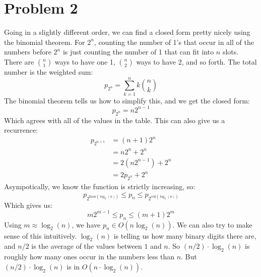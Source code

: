 \documentclass{article}
\begin{document}
    \section*{Problem 2}
        Going in a slightly different order, we can find a closed form pretty nicely using the
        binomial theorem. For $2^{n}$, counting the number of 1's that occur in all of the numbers
        before $2^{n}$ is just counting the number of 1 that can fit into $n$ slots.
        There are $\binom{n}{1}$ ways to have one 1, $\binom{n}{2}$ ways to have 2, and so forth.
        The total number is the weighted sum:
        \begin{equation}
            p_{2^{n}}=\sum_{k=1}^{n}k\binom{n}{k}
        \end{equation}
        The binomial theorem tells us how to simplify this, and we get the closed form:
        \begin{equation}
            p_{2^{n}}=n2^{n-1}
        \end{equation}
        Which agrees with all of the values in the table. This can also give us a
        recurrence:
        \begin{subequations}
            \begin{align}
                p_{2^{n+1}}&=(n+1)2^{n}\\
                    &=n2^{n}+2^{n}\\
                    &=2(n2^{n-1})+2^{n}\\
                    &=2p_{2^{n}}+2^{n}
            \end{align}
        \end{subequations}
        Asympotically, we know the function is strictly increasing, so:
        \begin{equation}
            p_{2^{\text{floor}(\log_{2}(n))}}\leq{p}_{n}\leq{p}_{2^{\text{ceil}(\log_{2}(n))}}
        \end{equation}
        Which gives us:
        \begin{equation}
            m2^{m-1}\leq{p}_{n}\leq(m+1)2^{m}
        \end{equation}
        Using $m\approx\log_{2}(n)$, we have $p_{n}\in{O}(n\log_{2}(n))$.
        We can also try to make sense of this intuitively. $\log_{2}(n)$ is telling us
        how many binary digits there are, and $n/2$ is the average of the values between $1$ and $n$.
        So $(n/2)\cdot\log_{2}(n)$ is roughly how many ones occur in the numbers less than $n$.
        But $(n/2)\cdot\log_{2}(n)$ is in $O(n\cdot\log_{2}(n))$.
\end{document}
